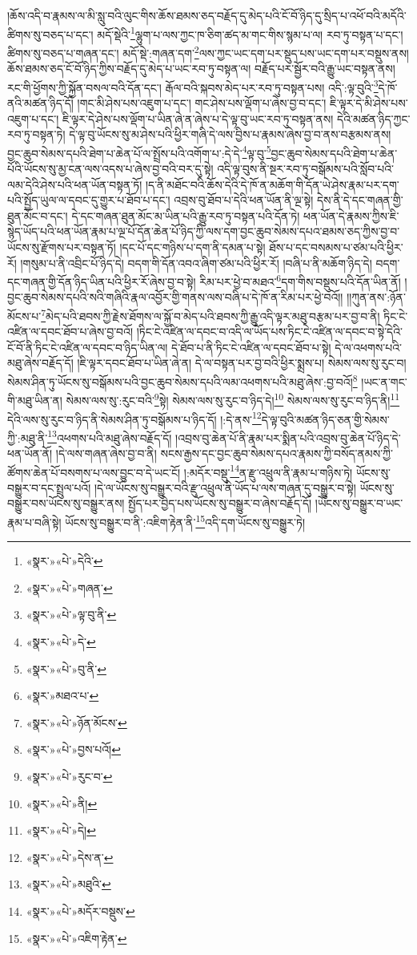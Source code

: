 །ཆོས་འདི་བ་རྣམས་ལ་མི་སླུ་བའི་ལུང་གིས་ཆོས་ཐམས་ཅད་བརྗོད་དུ་མེད་པའི་ངོ་བོ་ཉིད་དུ་སྲིད་པ་འཕོ་བའི་མདོའི་ཚིགས་སུ་བཅད་པ་དང་། མདོ་སྡེའི་\footnote{«སྣར་»«པེ་»དེའི་}ལྷུག་པ་ལས་ཀྱང་ཁ་ཅིག་ཚད་མ་གང་གིས་སྙམ་པ་ལ། རབ་ཏུ་བསྟན་པ་དང་། ཚིགས་སུ་བཅད་པ་གཞན་དང་། མདོ་སྡེ་:གཞན་དག་\footnote{«སྣར་»«པེ་»གཞན་}ལས་ཀྱང་ཡང་དག་པར་སྡུད་པས་ཡང་དག་པར་བསྡུས་ནས། ཆོས་ཐམས་ཅད་ངོ་བོ་ཉིད་ཀྱིས་བརྗོད་དུ་མེད་པ་ཡང་རབ་ཏུ་བསྟན་ལ། བརྗོད་པར་སྦྱོར་བའི་རྒྱུ་ཡང་བསྟན་ནས། རང་གི་ཕྱོགས་ཀྱི་སྐྱོན་བསལ་བའི་དོན་དང་། རྒོལ་བའི་སྐབས་མེད་པར་རབ་ཏུ་བསྟན་པས། འདི་:ལྟ་བུའི་\footnote{«སྣར་»«པེ་»ལྟ་བུ་ནི་}དེ་ཁོ་ནའི་མཚན་ཉིད་དོ། །གང་མི་ཤེས་པས་འཇུག་པ་དང་། གང་ཤེས་པས་ལྡོག་པ་ཞེས་བྱ་བ་དང་། ཇི་ལྟར་དེ་མི་ཤེས་པས་འཇུག་པ་དང་། ཇི་ལྟར་དེ་ཤེས་པས་ལྡོག་པ་ཡིན་ཞེ་ན་ཞེས་པ་དེ་ལྟ་བུ་ཡང་རབ་ཏུ་བསྟན་ནས། དེའི་མཚན་ཉིད་ཀྱང་རབ་ཏུ་བསྟན་ཏེ། དེ་ལྟ་བུ་ཡོངས་སུ་མ་ཤེས་པའི་ཕྱིར་གཞི་དེ་ལས་བྱིས་པ་རྣམས་ཞེས་བྱ་བ་ནས་བརྩམས་ནས། བྱང་ཆུབ་སེམས་དཔའི་ཐེག་པ་ཆེན་པོ་ལ་སྤྲོས་པའི་འགོག་པ་:དེ་དེ་\footnote{«སྣར་»«པེ་»དེ་}ལྟ་བུ་\footnote{«སྣར་»«པེ་»བུ་ནི་}བྱང་ཆུབ་སེམས་དཔའི་ཐེག་པ་ཆེན་པོའི་ཡོངས་སུ་མྱ་ངན་ལས་འདས་པ་ཞེས་བྱ་བའི་བར་དུ་སྟེ། འདི་ལྟ་བུས་ནི་སྔར་རབ་ཏུ་བསྒོམས་པའི་སློབ་པའི་ལམ་དེའི་ཤེས་པའི་ཕན་ཡོན་བསྟན་ཏོ། །ད་ནི་མཐོང་བའི་ཆོས་དེའི་དེ་ཁོ་ན་མཆོག་གི་དོན་ཡེ་ཤེས་རྣམ་པར་དག་པའི་སྤྱོད་ཡུལ་ལ་དབང་དུ་གྱུར་པ་ཐོབ་པ་དང་། འབྲས་བུ་ཐོབ་པ་དེའི་ཕན་ཡོན་ནི་ལྔ་སྟེ། དེས་ནི་དེ་དང་གཞན་གྱི་ཐུན་མོང་བ་དང་། དེ་དང་གཞན་ཐུན་མོང་མ་ཡིན་པའི་རྒྱུ་རབ་ཏུ་བསྟན་པའི་དོན་ཏེ། ཕན་ཡོན་དེ་རྣམས་ཀྱིས་ཇི་སྙེད་ཡོད་པའི་ཕན་ཡོན་རྣམ་པ་ལྔ་པོ་དོན་ཆེན་པོ་ཉིད་ཀྱི་ལས་དག་བྱང་ཆུབ་སེམས་དཔའ་ཐམས་ཅད་ཀྱིས་བྱ་བ་ཡོངས་སུ་རྫོགས་པར་བསྟན་ཏོ། །དང་པོ་དང་གཉིས་པ་དག་ནི་དམན་པ་སྟེ། ཐོས་པ་དང་བསམས་པ་ཙམ་པའི་ཕྱིར་རོ། །གསུམ་པ་ནི་འབྲིང་པོ་ཉིད་དེ། བདག་གི་དོན་འབའ་ཞིག་ཙམ་པའི་ཕྱིར་རོ། །བཞི་པ་ནི་མཆོག་ཉིད་དེ། བདག་དང་གཞན་གྱི་དོན་ཉིད་ཡིན་པའི་ཕྱིར་རོ་ཞེས་བྱ་བ་སྟེ། རིམ་པར་ཕྱེ་བ་མཐའ་\footnote{«སྣར་»མཐའ་པ་}དག་གིས་བསྡུས་པའི་དོན་ཡིན་ནོ། །བྱང་ཆུབ་སེམས་དཔའི་སའི་གཞིའི་རྣལ་འབྱོར་གྱི་གནས་ལས་བཞི་པ་དེ་ཁོ་ན་རིམ་པར་ཕྱེ་བའོ།། །།ཀུན་ནས་:ཉོན་མོངས་པ་\footnote{«སྣར་»«པེ་»ཉོན་མོངས་}མེད་པའི་ཐབས་ཀྱི་རྗེས་ཐོགས་ལ་སྐྱོ་བ་མེད་པའི་ཐབས་ཀྱི་རྒྱུ་འདི་ལྟར་མཐུ་བརྩམ་པར་བྱ་བ་ནི། ཏིང་ངེ་འཛིན་ལ་དབང་ཐོབ་པ་ཞེས་བྱ་བའོ། །ཏིང་ངེ་འཛིན་ལ་དབང་བ་འདི་ལ་ཡོད་པས་ཏིང་ངེ་འཛིན་ལ་དབང་བ་སྟེ་དེའི་ངོ་བོ་ནི་ཏིང་ངེ་འཛིན་ལ་དབང་བ་ཉིད་ཡིན་ལ། དེ་ཐོབ་པ་ནི་ཏིང་ངེ་འཛིན་ལ་དབང་ཐོབ་པ་སྟེ། དེ་ལ་འཕགས་པའི་མཐུ་ཞེས་བརྗོད་དོ། །ཇི་ལྟར་དབང་ཐོབ་པ་ཡིན་ཞེ་ན། དེ་ལ་བསྟན་པར་བྱ་བའི་ཕྱིར་སྨྲས་པ། སེམས་ལས་སུ་རུང་བ། སེམས་ཤིན་ཏུ་ཡོངས་སུ་བསྒོམས་པའི་བྱང་ཆུབ་སེམས་དཔའི་ལམ་འཕགས་པའི་མཐུ་ཞེས་:བྱ་བའོ།\footnote{«སྣར་»«པེ་»བྱས་པའོ།} །ཡང་ན་གང་གི་མཐུ་ཡིན་ན། སེམས་ལས་སུ་:རུང་བའི་\footnote{«སྣར་»«པེ་»རུང་བ་}སྟེ། སེམས་ལས་སུ་རུང་བ་ཉིད་དེ།\footnote{«སྣར་»«པེ་»ནི།} སེམས་ལས་སུ་རུང་བ་ཉིད་ནི།\footnote{«སྣར་»«པེ་»དེ།} དེའི་ལས་སུ་རུང་བ་ཉིད་ནི་སེམས་ཤིན་ཏུ་བསྒོམས་པ་ཉིད་དོ། །:དེ་ནས་\footnote{«སྣར་»«པེ་»དེས་ན་}དེ་ལྟ་བུའི་མཚན་ཉིད་ཅན་གྱི་སེམས་ཀྱི་:མཐུ་ནི་\footnote{«སྣར་»«པེ་»མཐུའི་}འཕགས་པའི་མཐུ་ཞེས་བརྗོད་དོ། །འབྲས་བུ་ཆེན་པོ་ནི་རྣམ་པར་སྨིན་པའི་འབྲས་བུ་ཆེན་པོ་ཉིད་དེ་ཕན་ཡོན་ནོ། །དེ་ལས་གཞན་ཞེས་བྱ་བ་ནི། སངས་རྒྱས་དང་བྱང་ཆུབ་སེམས་དཔའ་རྣམས་ཀྱི་བསོད་ནམས་ཀྱི་ཚོགས་ཆེན་པོ་བསགས་པ་ལས་བྱུང་བ་དེ་ཡང་ངོ། །:མདོར་བསྡུ་\footnote{«སྣར་»«པེ་»མདོར་བསྡུས་}ན་རྫུ་འཕྲུལ་ནི་རྣམ་པ་གཉིས་ཏེ། ཡོངས་སུ་བསྒྱུར་བ་དང་སྤྲུལ་པའོ། །དེ་ལ་ཡོངས་སུ་བསྒྱུར་བའི་རྫུ་འཕྲུལ་ནི་ཡོད་པ་ལས་གཞན་དུ་བསྒྱུར་བ་སྟེ། ཡོངས་སུ་བསྒྱུར་བས་ཡོངས་སུ་བསྒྱུར་ནས། སྤྱོད་པར་བྱེད་པས་ཡོངས་སུ་བསྒྱུར་བ་ཞེས་བརྗོད་དོ། །ཡོངས་སུ་བསྒྱུར་བ་ཡང་རྣམ་པ་བཞི་སྟེ། ཡོངས་སུ་བསྒྱུར་བ་ནི་:འཇིག་རྟེན་ནི་\footnote{«སྣར་»«པེ་»འཇིག་རྟེན་}འདི་དག་ཡོངས་སུ་བསྒྱུར་ཏེ། 